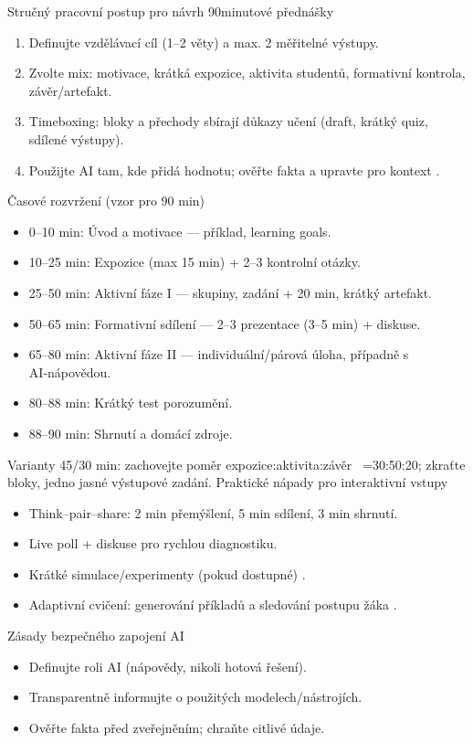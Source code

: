 \documentclass{report}%
\begin{document}
%
\medskip
Stručný pracovní postup pro návrh 90minutové přednášky
\begin{enumerate}
\item Definujte vzdělávací cíl (1–2 věty) a max. 2 měřitelné výstupy.
\item Zvolte mix: motivace, krátká expozice, aktivita studentů, formativní kontrola, závěr/artefakt.
\item Timeboxing: bloky a přechody sbírají důkazy učení (draft, krátký quiz, sdílené výstupy).
\item Použijte AI tam, kde přidá hodnotu; ověřte fakta a upravte pro kontext \cite{kb_ai_101_tipu_pdf_04e4a115_page_51_1}.
\end{enumerate}
\medskip
Časové rozvržení (vzor pro 90 min)
\begin{itemize}
\item 0–10 min: Úvod a motivace — příklad, learning goals.
\item 10–25 min: Expozice (max 15 min) + 2–3 kontrolní otázky.
\item 25–50 min: Aktivní fáze I — skupiny, zadání + 20 min, krátký artefakt.
\item 50–65 min: Formativní sdílení — 2–3 prezentace (3–5 min) + diskuse.
\item 65–80 min: Aktivní fáze II — individuální/párová úloha, případně s AI‑nápovědou.
\item 80–88 min: Krátký test porozumění.
\item 88–90 min: Shrnutí a domácí zdroje.
\end{itemize}
Varianty 45/30 min: zachovejte poměr expozice:aktivita:závěr ~=30:50:20; zkraťte bloky, jedno jasné výstupové zadání.
\medskip
Praktické nápady pro interaktivní vstupy
\begin{itemize}
\item Think–pair–share: 2 min přemýšlení, 5 min sdílení, 3 min shrnutí.
\item Live poll + diskuse pro rychlou diagnostiku.
\item Krátké simulace/experimenty (pokud dostupné) \cite{kb_ai_101_tipu_pdf_04e4a115_page_15_2}.
\item Adaptivní cvičení: generování příkladů a sledování postupu žáka \cite{kb_ai_101_tipu_pdf_04e4a115_page_8_1}.
\end{itemize}
\medskip
Zásady bezpečného zapojení AI
\begin{itemize}
\item Definujte roli AI (nápovědy, nikoli hotová řešení).
\item Transparentně informujte o použitých modelech/nástrojích.
\item Ověřte fakta před zveřejněním; chraňte citlivé údaje.
\end{itemize}
\end{document}
